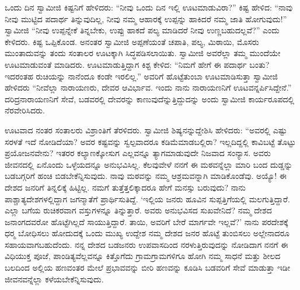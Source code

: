  ಒಂದು ದಿನ ಸ್ವಾಮೀಜಿ ಕಿಷ್ಟನಿಗೆ ಹೇಳಿದರು: “ನೀವು ಒಂದು ದಿನ ಇಲ್ಲಿ ಊಟಮಾಡುವಿರಾ?” ಕಿಷ್ಟ ಹೇಳಿದ: “ನಾವು ನೀವು ಮುಟ್ಟಿದ ಪದಾರ್ಥ ತಿನ್ನುವುದಿಲ್ಲ, ನೀವು ನಮ್ಮ ಆಹಾರಕ್ಕೆ ಉಪ್ಪನ್ನು ಹಾಕಿದರೆ ನಮ್ಮ ಜಾತಿ ಹೋಗುವುದು!” ಸ್ವಾಮೀಜಿ “ನೀವು ಉಪ್ಪನ್ನೇಕೆ ತಿನ್ನಬೇಕು, ಉಪ್ಪು ಹಾಕದೆ ಪಲ್ಯ ಮಾಡಿದರೆ ನೀವು ಉಣ್ಣಬಹುದಲ್ಲವೆ?” ಎಂದು ಕೇಳಿದರು. ಕಿಷ್ಟ ಒಪ್ಪಿಕೊಂಡ. ಅನಂತರ ಸ್ವಾಮೀಜಿ ಅಪ್ಪಣೆಯಂತೆ ಚಪಾತಿ, ಪಲ್ಯ, ಮಿಠಾಯಿ, ಮೊಸರು ಮುಂತಾದುವನ್ನು ತಂದು ಸಂತಾಲರ ಊಟಕ್ಕಾಗಿ ಸಿದ್ಧಪಡಿಸಲಾಯಿತು. ಸ್ವಾಮೀಜಿ ಅವರೆಲ್ಲಾ ತಮ್ಮ ಮುಂದೆಯೇ ಊಟಮಾಡುವಂತೆ ಮಾಡಿದರು. ಊಟಮಾಡುತ್ತಿದ್ದಾಗ ಕಿಶ್ಟ ಕೇಳಿದ: “ನಿಮಗೆ ಹೇಗೆ ಈ ಪದಾರ್ಥ ಬಂತು? ಇದರಂತಹ ರುಚಿಯನ್ನು ನಾನೆಂದೂ ಕಂಡೇ ಇರಲಿಲ್ಲ.” ಅವರಿಗೆ ಹೊಟ್ಟೆತುಂಬಾ ಊಟಮಾಡಿಸುತ್ತಾ ಸ್ವಾಮೀಜಿ ಹೇಳಿದರು “ನೀವೆಲ್ಲಾ ನಾರಾಯಣರು, ದೇವರ ಆವಿರ್ಭಾವ. ಇಂದು ನಾನು ನಾರಾಯಣನಿಗೆ ಊಟವನ್ನರ್ಪಿಸಿದ್ದೇನೆ.” ದರಿದ್ರನಾರಾಯಣನಿಗೆ ಸೇವೆ, ಬಡವರಲ್ಲಿ ದೇವರನ್ನು ಕಾಣುವುದೆನ್ನುತ್ತಿದ್ದುದನ್ನು ಅಂದು ಸ್ವಾಮೀಜಿ ಕಾರ್ಯರೂಪದಲ್ಲಿ ನೆರವೇರಿಸಿದರು. 

 ಊಟವಾದ ನಂತರ ಸಂತಾಲರು ವಿಶ್ರಾಂತಿಗೆ ತೆರಳಿದರು. ಸ್ವಾಮೀಜಿ ಶಿಷ್ಯನನ್ನುದ್ದೇಶಿಸಿ ಹೇಳಿದರು: “ಅವರಲ್ಲಿ ಎಷ್ಟು ಸರಳತೆ ಇದೆ ನೋಡಿದೆಯಾ? ಅವರ ಕಷ್ಟವನ್ನು ಸ್ವಲ್ಪವಾದರೂ ಕಡಿಮೆಮಾಡಬಲ್ಲಿರಾ? ಇಲ್ಲದಿದ್ದಲ್ಲಿ ಕಾವಿಬಟ್ಟೆ ತೊಟ್ಟು ಪ್ರಯೋಜನವೇನು? ಇತರರ ಕಲ್ಯಾಣಕ್ಕೋಸುಗ ಎಲ್ಲವನ್ನೂ ತ್ಯಾಗಮಾಡುವುದೇ ನಿಜವಾದ ಸಂನ್ಯಾಸ. ಅವರು ಜೀವನದಲ್ಲಿ ಏನೊಂದು ಒಳ್ಳೆಯದನ್ನೂ ಅನುಭವಿಸಿಲ್ಲ. ಕೆಲವುವೇಳೆ ನನಗೆ ಈ ಮಠವನ್ನೆಲ್ಲಾ ಮಾರಿ ಬಂದ ದುಡ್ಡನ್ನು ಬಡಬಗ್ಗರಿಗೆ ಹಂಚಿ ಬಿಡಬೇಕೆನ್ನಿಸುವುದು. ನಾವು ಮಠವನ್ನು ನಮ್ಮ ಆಶ್ರಮವನ್ನಾಗಿ ಮಾಡಿಕೊಂಡೆವು. ಅಯ್ಯೊ! ಈ ದೇಶದ ಜನರಿಗೆ ತಿನ್ನಲಿಕ್ಕೆ ಹಿಟ್ಟಿಲ್ಲ. ನಮಗೆ ತುತ್ತೆತ್ತಲಿಕ್ಕಾದರೂ ಹೇಗೆ ಮನಸ್ಸು ಬರುವುದು? ನಾನು ಪಾಶ್ಚಾತ್ಯದೇಶಗಳಲ್ಲಿದ್ದಾಗ ಜಗನ್ಮಾತೆಗೆ ಪ್ರಾರ್ಥಿಸುತಿದ್ದೆ. ‘ಇಲ್ಲಿಯ ಜನರು ಹೂವಿನ ಸುಪ್ಪತ್ತಿಗೆಯಲ್ಲಿ ಮಲಗುತ್ತಿದ್ದಾರೆ. ಎಲ್ಲಾ ಬಗೆಯ ರುಚಿಕರವಾಗ ವಸ್ತುಗಳನ್ನೂ ತಿನ್ನುತ್ತಾರೆ. ಅವರು ಅನುಭವಿಸದ ಸುಖವೇನಿದೆ? ನಮ್ಮ ದೇಶದ ಜನಾಂಗದವರೋ ಹೊಟ್ಟೆಗಿಲ್ಲದೆ ಸಾಯುತ್ತಿದ್ದಾರೆ. ತಾಯಿ, ಅವರಿಗೆ ಬೇರೆ ಮಾರ್ಗವೇ ಇಲ್ಲವೆ?’ ನಾನು ಪರದೇಶಕ್ಕೆ ಧರ‍್ಮ ಬೋಧಿಸಲು ಹೋದುದಕ್ಕೆ ಒಂದು ಮುಖ್ಯ ಉದ್ದೇಶ ನಮ್ಮ ದೇಶದ ಜನರ ಹೊಟ್ಟೆ ತುಂಬಿಸಲು ಅಲ್ಲೇನಾದರೂ ಸಹಾಯವಾಗಬಹುದೆಂದು. ನನ್ನ ದೇಶದ ಬಡಜನರು ಉಪವಾಸದಿಂದ ನರಳುತ್ತಿರುವುದನ್ನು ನೋಡಿದಾಗ ನನಗೆ ಈ ವಿಧಿಯುಕ್ತ ಪೂಜೆ, ಪಾಂಡಿತ್ಯವೆಲ್ಲವನ್ನೂ ಕಿತ್ತೊಗೆದು ಗ್ರಾಮಗ್ರಾಮಗಳಿಗೂ ಹೋಗಿ ನಮ್ಮ ಸಾಧನೆ ಮತ್ತು ಶೀಲದ ಬಲದಿಂದ ಅಲ್ಲಿಯ ಹಣವಂತರ ಮೇಲೆ ಪ್ರಭಾವವನ್ನು ಬೀರಿ ಹಣವನ್ನು ಕೂಡಿಸಿ ಬಡವರಿಗೆ ಸೇವೆ ಮಾಡುತ್ತಾ ಇಡೀ ಜೀವನವನ್ನೆಲ್ಲಾ ಕಳೆಯಬೇಕೆನ್ನಿಸುವುದು. 

